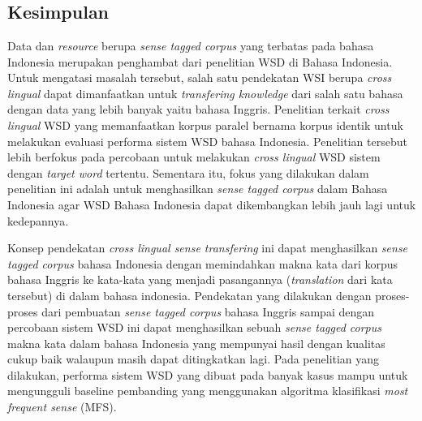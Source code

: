 \chapter{\babEnam}

\section{Kesimpulan}

Data dan \textit{resource} berupa \textit{sense tagged corpus} yang terbatas pada bahasa Indonesia merupakan penghambat dari penelitian WSD di Bahasa Indonesia. Untuk mengatasi masalah tersebut, salah satu pendekatan WSI berupa \textit{cross lingual} dapat dimanfaatkan untuk \textit{transfering knowledge} dari salah satu bahasa dengan data yang lebih banyak yaitu bahasa Inggris. Penelitian \citep{septiantri2013wsd} terkait \textit{cross lingual} WSD yang memanfaatkan korpus paralel bernama korpus identik untuk melakukan evaluasi performa sistem WSD bahasa Indonesia. Penelitian tersebut lebih berfokus pada percobaan untuk melakukan \textit{cross lingual} WSD sistem dengan \textit{target word} tertentu. Sementara itu, fokus yang dilakukan dalam penelitian ini adalah untuk menghasilkan \textit{sense tagged corpus} dalam Bahasa Indonesia agar WSD Bahasa Indonesia dapat dikembangkan lebih jauh lagi untuk kedepannya. 

Konsep pendekatan \textit{cross lingual sense transfering} ini dapat menghasilkan \textit{sense tagged corpus} bahasa Indonesia dengan memindahkan makna kata dari korpus bahasa Inggris ke kata-kata yang menjadi pasangannya (\textit{translation} dari kata tersebut) di dalam bahasa indonesia. Pendekatan yang dilakukan dengan proses-proses dari pembuatan \textit{sense tagged corpus} bahasa Inggris sampai dengan percobaan sistem WSD ini dapat menghasilkan sebuah \textit{sense tagged corpus} makna kata dalam bahasa Indonesia yang mempunyai hasil dengan kualitas cukup baik walaupun masih dapat ditingkatkan lagi. Pada penelitian yang dilakukan, performa sistem WSD yang dibuat pada banyak kasus mampu untuk mengungguli baseline pembanding yang menggunakan algoritma klasifikasi \textit{most frequent sense} (MFS).
